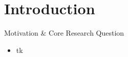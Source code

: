 \section{Introduction}

\begin{frame}{Motivation \& Core Research Question}
  \begin{itemize}
    \item tk
  \end{itemize}
\end{frame}
